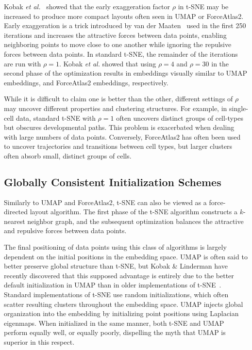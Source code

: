 \documentclass[twocolumn]{bmcart}
\begin{document}
Kobak \textit{et al.}~\cite{todo} showed that the early exaggeration factor $\rho$ in t-SNE may be increased to produce more compact layouts often seen in UMAP or ForceAtlas2. Early exaggeration is a trick introduced by van der Maaten~\cite{maaten2008visualizing} used in the first 250 iterations and increases the attractive forces between data points, enabling neighboring points to move close to one another while ignoring the repulsive forces between data points. In standard t-SNE, the remainder of the iterations are run with $\rho=1$. Kobak \textit{et al.} showed that using $\rho=4$ and $\rho=30$ in the second phase of the optimization results in embeddings visually similar to UMAP embeddings, and ForceAtlas2 embeddings, respectively.

While it is difficult to claim one is better than the other, different settings of $\rho$ may uncover different properties and clustering structures. For example, in single-cell data, standard t-SNE with $\rho=1$ often uncovers distinct groups of cell-types but obscures developmental paths. This problem is exacerbated when dealing with large numbers of data points. Conversely, ForceAtlas2 has often been used to uncover trajectories and transitions between cell types, but larger clusters often absorb small, distinct groups of cells.

\subsection*{Globally Consistent Initialization Schemes}

Similarly to UMAP and ForceAtlas2, t-SNE can also be viewed as a force-directed layout algorithm. The first phase of the t-SNE algorithm constructs a $k$-nearest neighbor graph, and the subsequent optimization balances the attractive and repulsive forces between data points.

The final positioning of data points using this class of algorithms is largely dependent on the initial positions in the embedding space. UMAP is often said to better preserve global structure than t-SNE, but Kobak \& Linderman have recently discovered that this supposed advantage is entirely due to the better default initialization in UMAP than in older implementations of t-SNE~\cite{kobak2019umap}. Standard implementations of t-SNE use random initializations, which often scatter resulting clusters throughout the embedding space. UMAP injects global organization into the embedding by initializing point positions using Laplacian eigenmaps. When initialized in the same manner, both t-SNE and UMAP perform equally well, or equally poorly, dispelling the myth that UMAP is superior in this respect.
\end{document}
